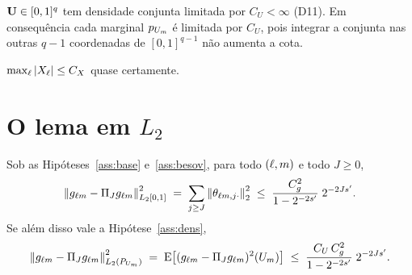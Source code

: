\documentclass[11pt,a4paper]{article}
\begin{document}
\begin{assumption}\label{ass:dens}
$\mathbf{U} \in [0,1]^{q}$ tem densidade conjunta limitada por $C_{U} < \infty$ (D11).
Em consequência cada marginal $p_{U_{m}}$ é limitada por $C_{U}$, pois
integrar a conjunta nas outras $q-1$ coordenadas de $[0,1]^{q-1}$ não aumenta
a cota.
\end{assumption}

\begin{assumption}\label{ass:X}
$\max_{\ell}|X_{\ell}| \le C_{X}$ quase certamente.
\end{assumption}

\section{O lema em $L_{2}$}

\begin{lemma}\label{lem:L2}
Sob as Hipóteses~\ref{ass:base} e~\ref{ass:besov}, para todo $(\ell,m)$ e
todo $J \ge 0$,
\[
  \left\lVert g_{\ell m} - \Pi_{J}g_{\ell m} \right\rVert_{L_{2}[0,1]}^{2}
  \;=\; \sum_{j \ge J}\left\lVert \theta_{\ell m,j\cdot} \right\rVert_{2}^{2}
  \;\le\; \frac{C_{g}^{2}}{1 - 2^{-2s'}}\; 2^{-2Js'}.
\]
Se além disso vale a Hipótese~\ref{ass:dens},
\[
  \left\lVert g_{\ell m} - \Pi_{J}g_{\ell m} \right\rVert_{L_{2}(P_{U_{m}})}^{2}
  \;=\; \mathrm{E}\bigl[(g_{\ell m} - \Pi_{J}g_{\ell m})^{2}(U_{m})\bigr]
  \;\le\; \frac{C_{U}\,C_{g}^{2}}{1 - 2^{-2s'}}\; 2^{-2Js'}.
\]
\end{lemma}
\end{document}
